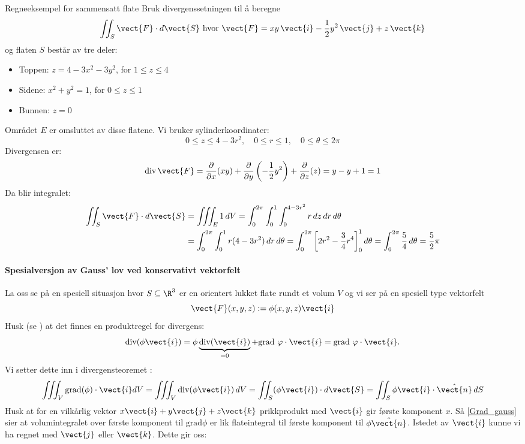 \begin{eks}{Regneeksempel for sammensatt flate}
Bruk divergenssetningen til å beregne  
\[
\iint_S \vect{F} \cdot d\vect{S} \text{ hvor } \vect{F} = xy\,\vect{i} - \frac{1}{2} y^2\,\vect{j} + z\,\vect{k}
\]  
og flaten \( S \) består av tre deler:
\begin{itemize}
  \item Toppen: \( z = 4 - 3x^2 - 3y^2 \), for \( 1 \leq z \leq 4 \)
  \item Sidene: \( x^2 + y^2 = 1 \), for \( 0 \leq z \leq 1 \)
  \item Bunnen: \( z = 0 \)
\end{itemize}
Området \( E \) er omsluttet av disse flatene. Vi bruker sylinderkoordinater:
\[
0 \leq z \leq 4 - 3r^2,\quad 0 \leq r \leq 1,\quad 0 \leq \theta \leq 2\pi
\]
Divergensen er:
\[
\text{div} \, \vect{F} = \frac{\partial}{\partial x}(xy) + \frac{\partial}{\partial y}\left(-\frac{1}{2}y^2\right) + \frac{\partial}{\partial z}(z) = y - y + 1 = 1
\]
Da blir integralet:
\begin{align*}
\iint_S \vect{F} \cdot d\vect{S} &= \iiint_E 1 \, dV = \int_0^{2\pi} \int_0^1 \int_0^{4 - 3r^2} r \, dz \, dr \, d\theta \\
&= \int_0^{2\pi} \int_0^1 r(4 - 3r^2) \, dr \, d\theta = \int_0^{2\pi} \left[2r^2 - \frac{3}{4}r^4\right]_0^1 d\theta = \int_0^{2\pi} \frac{5}{4} \, d\theta = \frac{5}{2} \pi
\end{align*}
\end{eks}

\paragraph{Spesialversjon av Gauss' lov ved konservativt vektorfelt}
La oss se på en spesiell situasjon hvor $S \subseteq \R^3$ er en orientert lukket flate rundt et volum $V$ og vi ser på en spesiell type vektorfelt 
\[\vect{F}(x,y,z):= \phi(x,y,z)\vect{i}\]
Husk (se ) at det finnes en produktregel for divergens:
\[\text{div} (\phi \vect{i})=\phi \underbrace{\text{div} (\vect{i})}_{=0} + \text{grad } \varphi \cdot \vect{i} = \text{grad } \varphi \cdot \vect{i}.\] 
Vi setter dette inn i  divergensteoremet :
\begin{align}\label{Grad_gauss}
\iiint_V \text{grad} (\phi) \cdot \vect{i} dV = \iiint_V  \text{div} (\phi\vect{i})\,dV= \iint_S (\phi \vect{i}) \cdot d\vect{S} = \iint_S \phi \vect{i} \cdot \hat{\vect{n}}\, dS 
\end{align}
Husk at for en vilkårlig vektor $x\vect{i}+y\vect{j}+z\vect{k}$ prikkprodukt med $\vect{i}$ gir første komponent $x$. 
Så \eqref{Grad_gauss} sier at volumintegralet over første komponent til $\text{grad} \phi$ er lik flateintegral til første komponent til $\phi \hat{\vect{n}}$. 
Istedet av $\vect{i}$ kunne vi ha regnet med $\vect{j}$ eller $ \vect{k}$. 
Dette gir oss:

